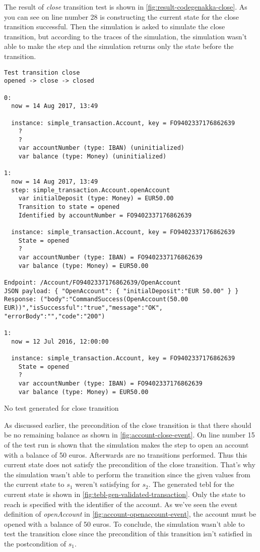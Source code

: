The result of \textit{close} transition test is shown in
\autoref{fig:result-codegenakka-close}. As you can see on line number 28 is
constructing the current state for the close transition successful. Then the
simulation is asked to simulate the close transition, but according to the
traces of the simulation, the simulation wasn't able to make the step and the
simulation returns only the state before the transition.

\begin{sourcecode}[h!]
\begin{lstlisting}[]
Test transition close
opened -> close -> closed

0:
  now = 14 Aug 2017, 13:49

  instance: simple_transaction.Account, key = FO9402337176862639
    ?
    ?
    var accountNumber (type: IBAN) (uninitialized)
    var balance (type: Money) (uninitialized)

1:
  now = 14 Aug 2017, 13:49
  step: simple_transaction.Account.openAccount
    var initialDeposit (type: Money) = EUR50.00
    Transition to state = opened
    Identified by accountNumber = FO9402337176862639

  instance: simple_transaction.Account, key = FO9402337176862639
    State = opened
    ?
    var accountNumber (type: IBAN) = FO9402337176862639
    var balance (type: Money) = EUR50.00

Endpoint: /Account/FO9402337176862639/OpenAccount
JSON payload: { "OpenAccount": { "initialDeposit":"EUR 50.00" } }
Response: ("body":"CommandSuccess(OpenAccount(50.00 EUR))","isSuccessful":"true","message":"OK",
"errorBody":"","code":"200")

1:
  now = 12 Jul 2016, 12:00:00

  instance: simple_transaction.Account, key = FO9402337176862639
    State = opened
    ?
    var accountNumber (type: IBAN) = FO9402337176862639
    var balance (type: Money) = EUR50.00
\end{lstlisting}
\caption{No test generated for close transition}
\label{fig:result-codegenakka-close}
\end{sourcecode}

As discussed earlier, the precondition of the close transition is that there
should be no remaining balance as shown in \autoref{fig:account-close-event}.
On line number 15 of the test run is shown that the simulation makes the step to
open an account with a balance of 50 euros. Afterwards are no transitions
performed. Thus this current state does not satisfy the precondition of the
close transition. That's why the simulation wasn't able to perform the
transition since the given values from the current state to $s_{1}$ weren't
satisfying for $s_{2}$. The generated tebl for the current state is shown in
\autoref{fig:tebl-gen-validated-transaction}. Only the state to reach is
specified with the identifier of the account. As we've seen the event definition
of \textit{openAccount} in \autoref{fig:account-openaccount-event}, the account
must be opened with a balance of 50 euros.
To conclude, the simulation wasn't able to test the transition close since the
precondition of this transition isn't satisfied in the postcondition of $s_{1}$.

